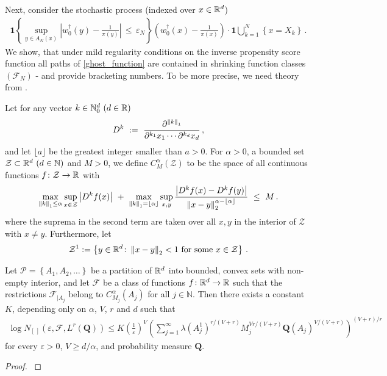Next, consider the stochastic process (indexed over $x\in\mathbb{R}^d$)
\begin{gather}
  \label{ghost_function}
  \mathbf{1}{
    \left\{ 
      \sup_{y\in A_N(x)}
      \left| 
      w_0^\dagger(y)
      -
      \frac{1}{\pi(y)}
      \right|
      \,
      \le
      \,
      \varepsilon_N
    \right\}
  }
  \left( 
    w_0^\dagger(x)
      -
      \frac{1}{\pi(x)}
  \right)
  \cdot
  \mathbf{1}
  \bigcup_{k=1}^N
  \left\{ x=X_k \right\}
  \,.
\end{gather}
We show, 
that under mild regularity conditions on the inverse propensity score function all paths of \eqref{ghost_function} are contained in shrinking function classes $(\mathcal{F}_N)$ - and provide bracketing numbers. 
To be more precise, we need theory from \cite[§2.7.1]{vaart2013}.

Let for any vector $k\in\mathbb{N}_0^d \ (d\in\R)$
\begin{gather*}
  D^k
  \ :=\ 
  \frac
  {\partial^{\norm{k}_1}}
  {
    \partial^{k_1}x_1
    \cdots
    \partial^{k_d}x_d
  }
  \,,
\end{gather*}
and let $\lfloor a \rfloor$ be the greatest integer smaller than $a>0$.
For $\alpha>0$, a bounded set 
$\mathcal{Z}\subset\R^d\ (d\in\mathbb{N})$
and
$M>0$, we define $C^\alpha_M(\mathcal{Z})$ to be the space of all continuous functions $f\colon \mathcal{Z}\to\mathbb{R}$ with
\begin{gather*}
  \max_{\norm{k}_1\le \alpha}\sup_{x\in\mathcal{Z}}
  \left| D^k f(x) \right|
  \ 
  +
  \ 
  \max_{\norm{k}_1=\lfloor \alpha \rfloor}\sup_{x,y}
  \frac
  {
  \left|
  D^k f(x) 
  -
  D^k f(y) 
  \right|
  }
  {
    \norm{x-y}_2^{\alpha-\lfloor \alpha \rfloor}
  }
  \
  \le
  \ 
  M
  \,.
\end{gather*}
where the suprema in the second term are taken over all $x,y$ in the interior of $\mathcal{Z}$ with $x\neq y$.
Furthermore, let
\begin{gather*}
  \mathcal{Z}^1
  :=
  \left\{ 
    y\in\R^d
    \colon
    \norm{x-y}_2 <1
    \ 
    \text{for some}\ x\in\mathcal{Z}
  \right\}
  \,.
\end{gather*}
\begin{lemma}
  \label{vdv_coro}
  Let $\mathcal{P}=\left\{ A_1,A_2,\ldots \right\}$ be a partition of $\mathbb{R}^d$ into bounded, convex sets with non-empty interior, and let $\mathcal{F}$ be a class of functions $f\colon\mathbb{R}^d\to\mathbb{R}$ such that the restrictions $\mathcal{F}_{|A_j}$ belong to $C^\alpha_{M_j}(A_j)$
  for all $j\in\mathbb{N}$.
  Then there exists a constant $K$, depending only on $\alpha$, $V$, $r$ and $d$
  such that
  \begin{gather}
    \label{667}
    \log
    N_{[\,]}
    (
    \varepsilon
    ,
    \mathcal{F}
    ,
    L^r(\mathbf{Q})
    )
    \le
    K
    \left( \frac{1}{\varepsilon} \right)^V
    \left( 
      \sum_{j=1}^{\infty}
      \lambda(A_j^1)^{r/(V+r)}
      M_j^{Vr/(V+r)}
      \mathbf{Q}(A_j)^{V/(V+r)}
    \right)
    ^{(V+r)/r}
  \end{gather}
  for every $\varepsilon>0$, $V\ge d/\alpha$, and probability measure $\mathbf{Q}$.
\end{lemma}
\begin{proof}
  \emph{\cite[Corollary~2.7.4]{vaart2013}}
\end{proof}

